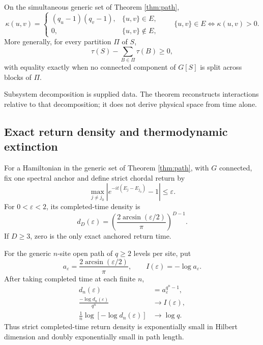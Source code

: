 \begin{theorem}
\label{thm:curvature}
On the simultaneous generic set of Theorem \ref{thm:path},
\begin{equation}
 \kappa(u,v)=
 \begin{cases}
 (q_u-1)(q_v-1),&\{u,v\}\in E,\\
 0,&\{u,v\}\notin E,
 \end{cases}
 \qquad
 \{u,v\}\in E\Longleftrightarrow\kappa(u,v)>0.       \label{eq:curvatureedge}
\end{equation}
More generally, for every partition $\Pi$ of $S$,
\begin{equation}
 \tau(S)-\sum_{B\in\Pi}\tau(B)\ge0,                 \label{eq:partitioncurvature}
\end{equation}
with equality exactly when no connected component of $G[S]$ is split across
blocks of $\Pi$.
\end{theorem}

Subsystem decomposition is supplied data.  The theorem reconstructs
interactions relative to that decomposition; it does not derive physical
space from time alone.

\subsection{Exact return density and thermodynamic extinction}

For a Hamiltonian in the generic set of Theorem \ref{thm:path}, with $G$
connected, fix one spectral anchor and define strict chordal return by
\begin{equation}
 \max_{j\ne j_0}|e^{-it(E_j-E_{j_0})}-1|\le\varepsilon.
 \label{eq:anchoredtarget-main}
\end{equation}
For $0<\varepsilon<2$, its completed-time density is
\begin{equation}
 d_D(\varepsilon)=
 \left(\frac{2\arcsin(\varepsilon/2)}{\pi}\right)^{D-1}.
 \label{eq:exactdensity}
\end{equation}
If $D\ge3$, zero is the only exact anchored return time.

\begin{corollary}
\label{cor:thermodynamic}
For the generic $n$-site open path of $q\ge2$ levels per site, put
\begin{equation}
 a_\varepsilon=\frac{2\arcsin(\varepsilon/2)}{\pi},
 \qquad I(\varepsilon)=-\log a_\varepsilon.
\end{equation}
After taking completed time at each finite $n$,
\begin{align}
 d_n(\varepsilon)&=a_\varepsilon^{q^n-1},\\
 \frac{-\log d_n(\varepsilon)}{q^n}&\longrightarrow I(\varepsilon),
 \label{eq:thermograph}\\
 \frac1n\log[-\log d_n(\varepsilon)]&\longrightarrow\log q.
 \label{eq:doubleloggraph}
\end{align}
Thus strict completed-time return density is exponentially small in Hilbert
dimension and doubly exponentially small in path length.
\end{corollary}

